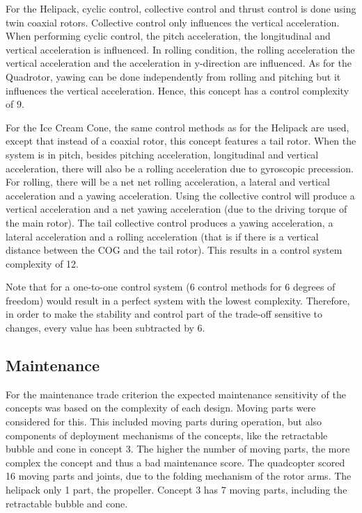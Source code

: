 For the Helipack, cyclic control, collective control and thrust control is done using twin coaxial rotors. Collective control only influences the vertical acceleration. When performing cyclic control, the pitch acceleration, the longitudinal and vertical acceleration is influenced. In rolling condition, the rolling acceleration the vertical acceleration and the acceleration in y-direction are influenced. As for the Quadrotor, yawing can be done independently from rolling and pitching but it influences the vertical acceleration. Hence, this concept has a control complexity of 9.

For the Ice Cream Cone, the same control methods as for the Helipack are used, except that instead of a coaxial rotor, this concept features a tail rotor. When the system is in pitch, besides pitching acceleration, longitudinal and vertical acceleration, there will also be a rolling acceleration due to gyroscopic precession. For rolling, there will be a net net rolling acceleration, a lateral and vertical acceleration and a yawing acceleration. Using the collective control will produce a vertical acceleration and a net yawing acceleration (due to the driving torque of the main rotor). The tail collective control produces a yawing acceleration, a lateral acceleration and a rolling acceleration (that is if there is a vertical distance between the COG and the tail rotor). This results in a control system complexity of 12. 

Note that for a one-to-one control system (6 control methods for 6 degrees of freedom) would result in a perfect system with the lowest complexity. Therefore, in order to make the stability and control part of the trade-off sensitive to changes, every value has been subtracted by 6.

\subsection{Maintenance}
For the maintenance trade criterion the expected maintenance sensitivity of the concepts was based on the complexity of each design. Moving parts were considered for this. This included moving parts during operation, but also components of deployment mechanisms of the concepts, like the retractable bubble and cone in concept 3. The higher the number of moving parts, the more complex the concept and thus a bad maintenance score. The quadcopter scored 16 moving parts and joints, due to the folding mechanism of the rotor arms. The helipack only 1 part, the propeller. Concept 3 has 7 moving parts, including the retractable bubble and cone.